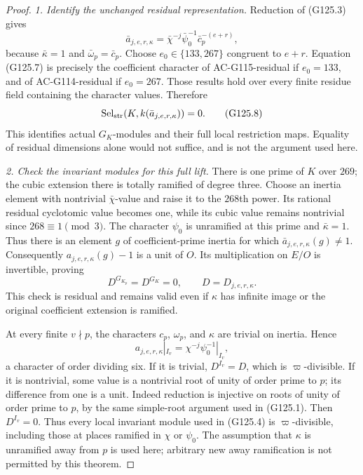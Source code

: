 \begin{proof}
\emph{1. Identify the unchanged residual representation.}
Reduction of (G125.3) gives
\[
 \bar a_{j,e,r,\kappa}
       =\bar\chi^{-j}\bar\psi_0^{-1}\bar c_p^{-(e+r)},
 \tag{G125.7}
\]
because \(\bar\kappa=1\) and \(\bar\omega_p=\bar c_p\).
Choose \(e_0\in\{133,267\}\) congruent to \(e+r\).
Equation (G125.7) is precisely the coefficient character of
AC-G115-residual if \(e_0=133\), and of AC-G114-residual
if \(e_0=267\).  Those results hold over every finite residue
field containing the character values.  Therefore
\[
       \operatorname{Sel}_{\rm str}(K,k(\bar a_{j,e,r,\kappa}))=0.
 \tag{G125.8}
\]
This identifies actual \(G_K\)-modules and their full local
restriction maps.  Equality of residual dimensions alone would
not suffice, and is not the argument used here.

\emph{2. Check the invariant modules for this full lift.}
There is one prime of \(K\) over \(269\); the cubic extension
there is totally ramified of degree three.  Choose an inertia
element with nontrivial \(\bar\chi\)-value and raise it to the
\(268\)th power.  Its rational residual cyclotomic value becomes
one, while its cubic value remains nontrivial since
\(268\equiv1\pmod3\).  The character \(\psi_0\) is unramified
at this prime and \(\bar\kappa=1\).  Thus there is an element
\(g\) of coefficient-prime inertia for which
\(\bar a_{j,e,r,\kappa}(g)\ne1\).
Consequently \(a_{j,e,r,\kappa}(g)-1\) is a unit of \(O\).
Its multiplication on \(E/O\) is invertible, proving
\[
                  D^{G_{K_p}}=D^{G_K}=0,
             \qquad D=D_{j,e,r,\kappa}.
 \tag{G125.9}
\]
This check is residual and remains valid even if \(\kappa\)
has infinite image or the original coefficient extension is ramified.

At every finite \(v\nmid p\), the characters \(c_p\),
\(\omega_p\), and \(\kappa\) are trivial on inertia.
Hence
\[
                  a_{j,e,r,\kappa}|_{I_v}
                              =\chi^{-j}\psi_0^{-1}|_{I_v},
 \tag{G125.10}
\]
a character of order dividing six.  If it is trivial,
\(D^{I_v}=D\), which is \(\varpi\)-divisible.  If it is
nontrivial, some value is a nontrivial root of unity of order
prime to \(p\); its difference from one is a unit.  Indeed
reduction is injective on roots of unity of order prime to
\(p\), by the same simple-root argument used in (G125.1).
Then \(D^{I_v}=0\).  Thus every local invariant module used
in (G125.4) is \(\varpi\)-divisible, including those at
places ramified in \(\chi\) or \(\psi_0\).
The assumption that \(\kappa\) is unramified away from
\(p\) is used here; arbitrary new away ramification is not
permitted by this theorem.


\end{proof}
